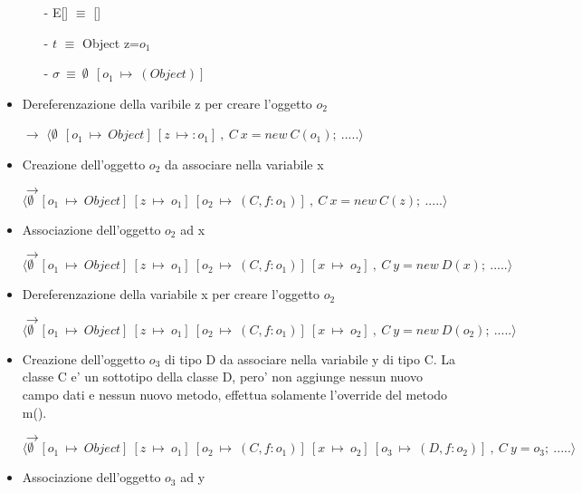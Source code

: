 \begin{itemize}
		\begin{itemize}
		\item[-] E[] $\equiv$ []
		\item[-] $t$ $\equiv$ Object z=$o_1$ 
		\item[-] $\sigma\:\equiv\:\emptyset\:\:[o_1\:\mapsto\:(Object)]$
		\end{itemize}


\vspace{0,5cm}
\item Dereferenzazione della varibile z per creare l'oggetto $o_2$

$\rightarrow$ $\langle\emptyset\:\:[o_1\:\mapsto\:Object]\:[z\:\mapsto:o_1]\:,\:C\:x=new\:C(o_1);\:.....\rangle$

\vspace{0,5cm}
\item Creazione dell'oggetto $o_2$ da associare nella variabile x

$\rightarrow$ $\langle\emptyset\:\:[o_1\:\mapsto\:Object]\:[z\:\mapsto\:o_1]\:[o_2\:\mapsto\:(C,f:o_1)]\:,\:C\:x=new\:C(z);\:.....\rangle$

\vspace{0,5cm}
\item Associazione dell'oggetto $o_2$ ad x

$\rightarrow$ $\langle\emptyset\:\:[o_1\:\mapsto\:Object]\:[z\:\mapsto\:o_1]\:[o_2\:\mapsto\:(C,f:o_1)]\:[x\:\mapsto\:o_2]\:,\:C\:y=new\:D(x);\:.....\rangle$

\vspace{0,5cm}
\item Dereferenzazione della variabile x per creare l'oggetto $o_2$

$\rightarrow$ $\langle\emptyset\:\:[o_1\:\mapsto\:Object]\:[z\:\mapsto\:o_1]\:[o_2\:\mapsto\:(C,f:o_1)]\:[x\:\mapsto\:o_2]\:,\:C\:y=new\:D(o_2);\:.....\rangle$

\vspace{0,5cm}
\item Creazione dell'oggetto $o_3$ di tipo D da associare nella variabile y di tipo C. La classe C e' un sottotipo della classe D, pero' non aggiunge nessun nuovo campo dati e nessun nuovo metodo, effettua solamente l'override del metodo m().

$\rightarrow$ $\langle\emptyset\:\:[o_1\:\mapsto\:Object]\:[z\:\mapsto\:o_1]\:[o_2\:\mapsto\:(C,f:o_1)]\:[x\:\mapsto\:o_2]\:[o_3\:\mapsto\:(D,f:o_2)]\:,\:C\:y=o_3;\:.....\rangle$

\vspace{0,5cm}
\item Associazione dell'oggetto $o_3$ ad y


\end{itemize}
